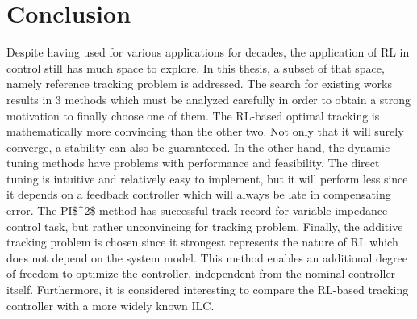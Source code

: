\chapter{Conclusion}
Despite having used for various applications for decades, the application of \acs {RL} in control still has much space to explore. In this thesis, a subset of that space, namely reference tracking problem is addressed. The search for existing works results in 3 methods which must be analyzed carefully in order to obtain a strong motivation to finally choose one of them. The \acs {RL}-based optimal tracking is mathematically more convincing than the other two. Not only that it will surely converge, a stability can also be guaranteeed. In the other hand, the dynamic tuning methods have problems with performance and feasibility. The direct tuning is intuitive and relatively easy to implement, but it will perform less since it depends on a feedback controller which will always be late in compensating error. The \acs{PI$^2$} method has successful track-record for variable impedance control task, but rather unconvincing for tracking problem. Finally, the additive tracking problem is chosen since it strongest represents the nature of \acs {RL} which does not depend on the system model. This method enables an additional degree of freedom to optimize the controller, independent from the nominal controller itself. Furthermore, it is considered interesting to compare the \acs{RL}-based tracking controller with a more widely known \acs{ILC}.